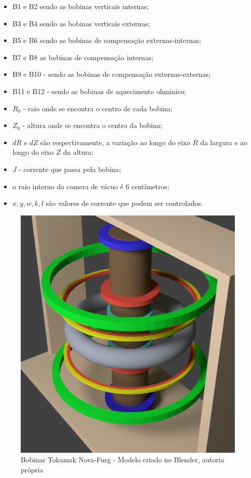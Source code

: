 \documentclass[12pt,oneside,a4paper]{abntex2}
\begin{document}
\begin{itemize}
\item B1 e B2 sendo as bobinas verticais internas; 
\item B3 e B4 sendo as bobinas verticais externas;  
\item B5 e B6 sendo as bobinas de compensação externas-internas;
\item B7 e B8 as bobinas de compensação internas;
\item B9 e B10 - sendo as bobinas de compensação externas-externas;
\item B11 e B12 - sendo as bobinas de aquecimento ohminico;
\item $R_0$ - raio onde se encontra o centro de cada bobina; 
\item $Z_0$ - altura onde se encontra o centro da bobina; 
\item $dR$ e $dZ$ são respectivamente, a variação ao longo do eixo $R$ da largura e ao longo do eixo $Z$ da altura;
\item $J$ - corrente que passa pela bobina;
\item o raio interno da camera de vácuo é 6 centímetros;
\item $x,y,w,k,l$ são valores de corrente que podem ser controlados.
\end{itemize}
\newpage
\begin{figure}[h]
\centering
\caption{Bobinas Tokamak Nova-Furg - Modelo criado no Blender, autoria própria}
\label{fig: btokamak}
\includegraphics[scale=0.8]{bob2.png}  
\end{figure}
\end{document}

